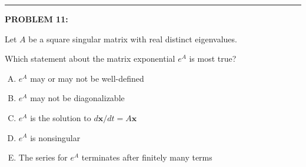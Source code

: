 \documentclass[12pt]{amsart}
\newcommand{\divider}{
  \vspace{-1em} %
  \noindent
  \raisebox{-0.15ex}{\textbullet}%
  \hspace{0.5em}%
  \rule[0.5ex]{0.95\textwidth}{1.0pt}%
  \hspace{0.5em}%
  \raisebox{-0.15ex}{\textbullet}%
  \vspace{0em} %
}
\begin{document}

\divider

{\bf PROBLEM 11:}

Let $A$ be a square singular matrix with real distinct eigenvalues.

Which statement about the matrix exponential $e^A$ is most true?

\begin{enumerate}[(A)]
\item $e^A$ may or may not be well-defined
\item $e^A$ may not be diagonalizable
\item $e^A$ is the solution to $d\mathbf{x}/dt=A\mathbf{x}$
\item $e^A$ is nonsingular
\item The series for $e^A$ terminates after finitely many terms
\end{enumerate}
\end{document}

